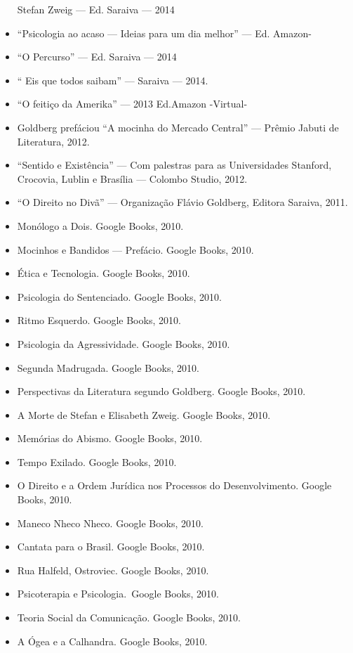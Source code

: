 \begin{itemize}
  Stefan Zweig --- Ed. Saraiva --- 2014
\item
  ``Psicologia ao acaso --- Ideias para um dia melhor'' --- Ed. Amazon-
\item
  ``O Percurso'' --- Ed. Saraiva --- 2014
\item
  `` Eis que todos saibam'' ---  Saraiva --- 2014.
\item
  ``O feitiço da Amerika'' --- 2013 Ed.Amazon -Virtual-
\item
  Goldberg prefáciou ``A mocinha do Mercado Central'' --- Prêmio Jabuti
  de Literatura, 2012.
\item
  ``Sentido e Existência'' --- Com palestras para as Universidades
  Stanford, Crocovia, Lublin e Brasília --- Colombo Studio, 2012.
\item
  ``O Direito no Divã'' --- Organização Flávio Goldberg, Editora
  Saraiva, 2011.
\item
  Monólogo a Dois. Google Books, 2010.
\item
  Mocinhos e Bandidos --- Prefácio. Google Books, 2010.
\item
  Ética e Tecnologia. Google Books, 2010.
\item
  Psicologia do Sentenciado. Google Books, 2010.
\item
  Ritmo Esquerdo. Google Books, 2010.
\item
  Psicologia da Agressividade. Google Books, 2010.
\item
  Segunda Madrugada. Google Books, 2010.
\item
  Perspectivas da Literatura segundo Goldberg. Google Books, 2010.
\item
  A Morte de Stefan e Elisabeth Zweig. Google Books, 2010.
\item
  Memórias do Abismo. Google Books, 2010.
\item
  Tempo Exilado. Google Books, 2010.
\item
  O Direito e a Ordem Jurídica nos Processos do Desenvolvimento. Google
  Books, 2010.
\item
  Maneco Nheco Nheco. Google Books, 2010.
\item
  Cantata para o Brasil. Google Books, 2010.
\item
  Rua Halfeld, Ostroviec. Google Books, 2010.
\item
  Psicoterapia e Psicologia.~Google Books, 2010.
\item
  Teoria Social da Comunicação. Google Books, 2010.
\item
  A Ógea e a Calhandra. Google Books, 2010.

\end{itemize}
